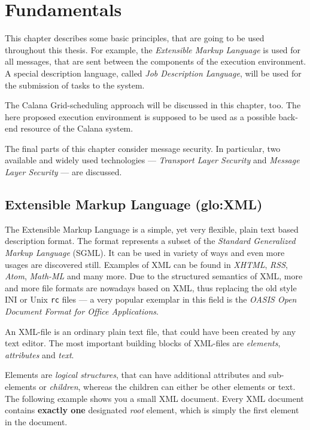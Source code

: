 \chapter{Fundamentals}
\label{cha:fundamentals}

This chapter  describes some basic principles,  that are going  to be used
throughout this thesis. For example, the \emph{Extensible Markup Language}
is used  for all  messages, that  are sent between  the components  of the
execution  environment. A special  description language,  called \emph{Job
  Description Language}, will  be used for the submission  of tasks to the
system.

The  Calana Grid-scheduling approach  will be  discussed in  this chapter,
too. The here  proposed execution environment is supposed to  be used as a
possible back-end resource of the Calana system.

The final parts of this  chapter consider message security. In particular,
two  available  and widely  used  technologies  --- \emph{Transport  Layer
  Security} and \emph{Message Layer Security} --- are discussed.

\section[Extensible Markup Language]
{Extensible Markup Language (\gls{glo:XML})}

The Extensible Markup Language \cite{xml}  is a simple, yet very flexible,
plain text based description format. The format represents a subset of the
\emph{Standard  Generalized Markup Language}  (SGML).  It  can be  used in
variety of ways and even more usages are discovered still. Examples of XML
can be found in  \emph{XHTML}, \emph{RSS}, \emph{Atom}, \emph{Math-ML} and
many more.   Due to the  structured semantics of  XML, more and  more file
formats are  nowadays based on  XML, thus replacing  the old style  INI or
Unix \texttt{rc}  files --- a very  popular exemplar in this  field is the
\emph{OASIS Open Document Format for Office Applications}.

An XML-file is  an ordinary plain text file, that  could have been created
by any text  editor.  The most important building  blocks of XML-files are
\emph{elements}, \emph{attributes} and \emph{text}.

Elements   are  \emph{logical  structures},   that  can   have  additional
attributes and  sub-elements or \emph{children}, whereas  the children can
either be other elements or text.  The following example shows you a small
XML document. Every XML  document contains \textbf{exactly one} designated
\emph{root} element, which is simply the first element in the document.

